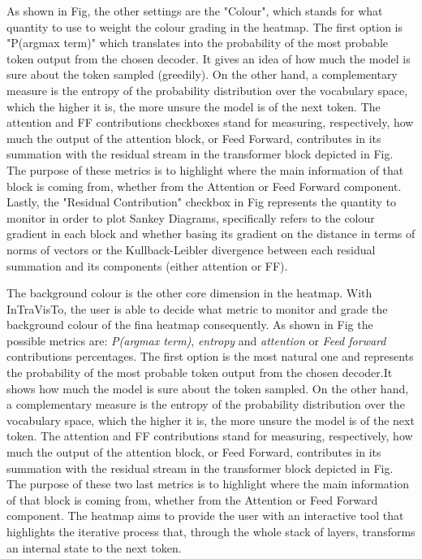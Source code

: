 {As shown in Fig, the other settings are the "Colour", which stands for what quantity to use to weight the colour grading in the heatmap.
The first option is "P(argmax term)" which translates into the probability of the most probable token output from the chosen decoder.
It gives an idea of how much the model is sure about the token sampled (greedily).
On the other hand, a complementary measure is the entropy of the probability distribution over the vocabulary space, which the higher it is, the more unsure the model is of the next token.
The attention and FF contributions checkboxes stand for measuring, respectively, how much the output of the attention block, or Feed Forward, contributes in its summation with the residual stream in the transformer block depicted in Fig.
The purpose of these metrics is to highlight where the main information of that block is coming from, whether from the Attention or Feed Forward component.
Lastly, the "Residual Contribution" checkbox in Fig represents the quantity to monitor in order to plot Sankey Diagrams, specifically refers to the colour gradient in each block and whether basing its gradient on the distance in terms of norms of vectors or the Kullback-Leibler divergence between each residual summation and its components (either attention or FF).

The background colour is the other core dimension in the heatmap.
With InTraVisTo, the user is able to decide what metric to monitor and grade the background colour of the fina heatmap consequently.
As shown in Fig the possible metrics are: \emph{P(argmax term)}, \emph{entropy} and \emph{attention} or \emph{Feed forward} contributions percentages.
The first option is the most natural one and represents the probability of the most probable token output from the chosen decoder.It shows how much the model is sure about the token sampled.
On the other hand, a complementary measure is the entropy of the probability distribution over the vocabulary space, which the higher it is, the more unsure the model is of the next token.
The attention and FF contributions stand for measuring, respectively, how much the output of the attention block, or Feed Forward, contributes in its summation with the residual stream in the transformer block depicted in Fig.
The purpose of these two last metrics is to highlight where the main information of that block is coming from, whether from the Attention or Feed Forward component.
The heatmap aims to provide the user with an interactive tool that highlights the iterative process that, through the whole stack of layers, transforms an internal state to the next token.
    
}
